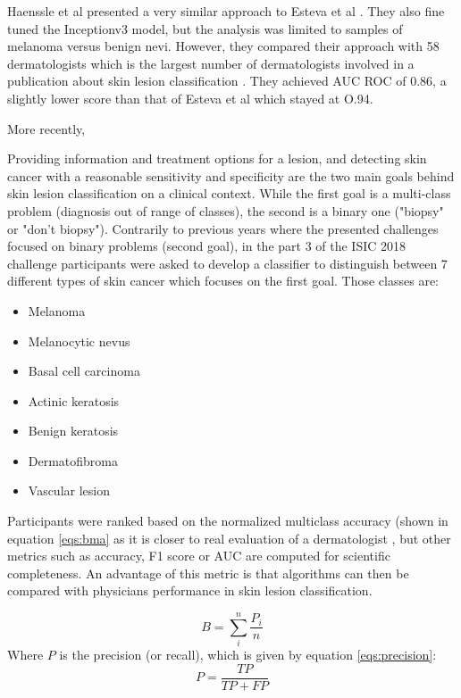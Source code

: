 Haenssle et al \cite{Haenssle2018} presented a very similar approach to Esteva et al \cite{}. They also fine tuned the Inceptionv3 model, but the analysis was limited to samples of melanoma versus benign nevi. However, they compared their approach with 58 dermatologists which is the largest number of dermatologists involved in a publication about skin lesion classification \cite{Brinker2018}. They achieved AUC ROC of 0.86, a slightly lower score than that of Esteva et al which stayed at O.94. \par 
More recently, 

Providing information and treatment options for a lesion, and detecting skin cancer with a reasonable sensitivity and specificity are the two main goals behind skin lesion classification on a clinical context. While the first goal is a multi-class problem (diagnosis out of range of classes), the second is a binary one ("biopsy" or "don't biopsy"). Contrarily to previous years where the presented challenges focused on binary problems (second goal), in the part 3 of the ISIC 2018 challenge participants were asked to develop a classifier to distinguish between 7 different types of skin cancer which focuses on the first goal. Those classes are:
\begin{itemize}
    \item Melanoma 
    \item Melanocytic nevus 
    \item Basal cell carcinoma 
    \item Actinic keratosis 
    \item Benign keratosis 
    \item Dermatofibroma 
    \item Vascular lesion
\end{itemize}

Participants were ranked based on the normalized multiclass accuracy (shown in equation \ref{eqs:bma} as it is closer to real evaluation of a dermatologist \cite{isic2018}, but other metrics such as accuracy, F1 score or AUC are computed for scientific completeness. An advantage of this metric is that algorithms can then be compared with physicians performance in skin lesion classification. \par 
\begin{equation} 
    B=\sum_{i}^{n} \frac{P_i}{n} \label{eqs:bma}    
\end{equation}
Where $P$ is the precision (or recall), which is given by equation \ref{eqs:precision}:
\begin{equation}
    P=\frac{TP}{TP+FP} \label{eqs:precision}    
\end{equation}

